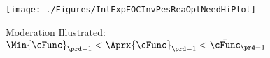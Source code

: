   \hypertarget{IntExpFOCInvPesReaOptNeedHiPlot}{}
  \begin{figure}
    \texttt{[image: ./Figures/IntExpFOCInvPesReaOptNeedHiPlot]}
    \caption{Moderation Illustrated: $\Min{\cFunc}_{\prd-1} < \Aprx{\cFunc}_{\prd-1} < \bar{\cFunc}_{\prd-1}$}
    \label{fig:IntExpFOCInvPesReaOptNeedHiPlot}
  \end{figure}
